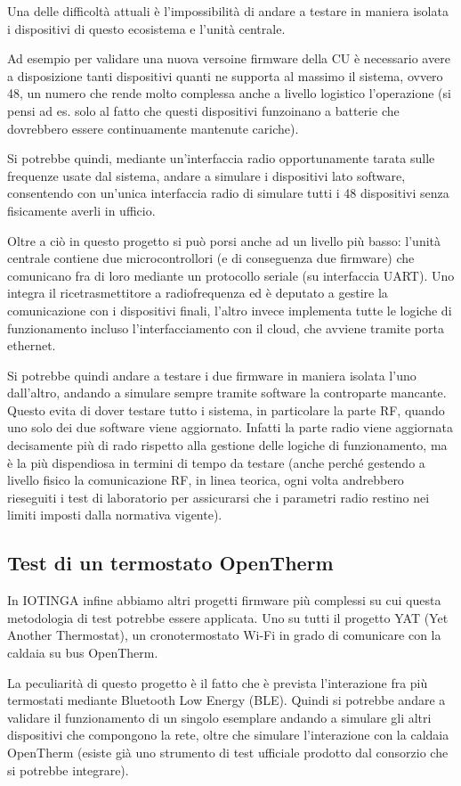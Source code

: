 \documentclass[12pt,a4paper,twoside,titlepage]{book}
\begin{document}
Una delle difficoltà attuali è l'impossibilità di andare a testare in maniera isolata i
dispositivi di questo ecosistema e l'unità centrale.

Ad esempio per validare una nuova versoine firmware della CU è necessario avere a disposizione tanti dispositivi quanti
ne supporta al massimo il sistema, ovvero 48, un numero che rende molto complessa anche a
livello logistico l'operazione (si pensi ad es. solo al fatto che questi dispositivi funzoinano a
batterie che dovrebbero essere continuamente mantenute cariche).

Si potrebbe quindi, mediante un'interfaccia radio opportunamente tarata sulle frequenze usate
dal sistema, andare a simulare i dispositivi lato software, consentendo con un'unica interfaccia
radio di simulare tutti i 48 dispositivi senza fisicamente averli in ufficio.

Oltre a ciò in questo progetto si può porsi anche ad un livello più basso: l'unità
centrale contiene due microcontrollori (e di conseguenza due firmware) che comunicano fra di
loro mediante un protocollo seriale (su interfaccia UART). Uno integra il ricetrasmettitore
a radiofrequenza ed è deputato a gestire la comunicazione con i dispositivi
finali, l'altro invece implementa tutte le logiche di funzionamento incluso l'interfacciamento
con il cloud, che avviene tramite porta ethernet.

Si potrebbe quindi andare a testare i due firmware in maniera isolata l'uno dall'altro,
andando a simulare sempre tramite software la controparte mancante. Questo evita di dover
testare tutto i sistema, in particolare la parte RF, quando uno solo dei due software viene
aggiornato. Infatti la parte radio viene aggiornata decisamente più di rado rispetto alla
gestione delle logiche di funzionamento, ma è la più dispendiosa in termini di tempo da testare
(anche perché gestendo a livello fisico la comunicazione RF, in linea teorica, ogni volta andrebbero
rieseguiti i test di laboratorio per assicurarsi che i parametri radio restino nei limiti
imposti dalla normativa vigente).

\subsection{Test di un termostato OpenTherm}

In IOTINGA infine abbiamo altri progetti firmware più complessi su cui questa metodologia
di test potrebbe essere applicata. Uno su tutti il progetto YAT (Yet Another Thermostat),
un cronotermostato Wi-Fi in grado di comunicare con la caldaia su bus OpenTherm.

La peculiarità di questo progetto è il fatto che è prevista l'interazione fra più
termostati mediante Bluetooth Low Energy (BLE). Quindi si potrebbe andare a validare
il funzionamento di un singolo esemplare andando a simulare gli altri dispositivi
che compongono la rete, oltre che simulare l'interazione con la caldaia OpenTherm
(esiste già uno strumento di test ufficiale prodotto dal consorzio che si potrebbe
integrare).
\end{document}
